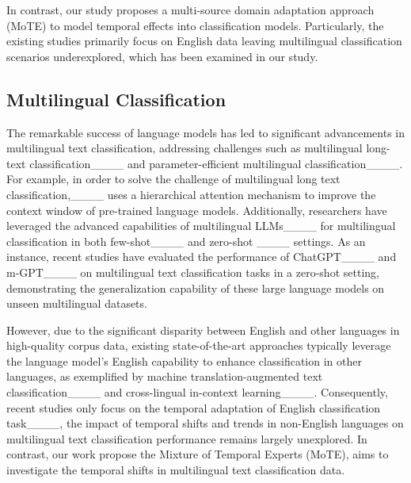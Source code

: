 In contrast, our study proposes a multi-source domain adaptation approach (MoTE) to model temporal effects into classification models. Particularly, the existing studies primarily focus on English data leaving multilingual classification scenarios underexplored, which has been examined in our study.


\subsection{Multilingual Classification}

% 

The remarkable success of language models has led to significant advancements in multilingual text classification, addressing challenges such as multilingual long-text classification____ and parameter-efficient multilingual classification____.
For example, in order to solve the challenge of multilingual long text classification,____ uses a hierarchical attention mechanism to improve the context window of pre-trained language models. 
Additionally, researchers have leveraged the advanced capabilities of multilingual LLMs____ for multilingual classification in both few-shot____ and zero-shot ____ settings.
As an instance, recent studies have evaluated the performance of ChatGPT____ and m-GPT____ on multilingual text classification tasks in a zero-shot setting, demonstrating the generalization capability of these large language models on unseen multilingual datasets.



However, due to the significant disparity between English and other languages in high-quality corpus data, existing state-of-the-art approaches typically leverage the language model's English capability to enhance classification in other languages, as exemplified by machine translation-augmented text classification____ and cross-lingual in-context learning____. 
Consequently, recent studies only focus on the temporal adaptation of English classification task____, the impact of temporal shifts and trends in non-English languages on multilingual text classification performance remains largely unexplored.
In contrast, our work propose the Mixture of Temporal Experts (MoTE), aims to investigate the temporal shifts in multilingual text classification data.